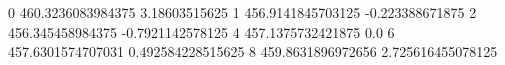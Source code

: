 0 460.3236083984375 3.18603515625
1 456.9141845703125 -0.223388671875
2 456.345458984375 -0.7921142578125
4 457.1375732421875 0.0
6 457.6301574707031 0.492584228515625
8 459.8631896972656 2.725616455078125
